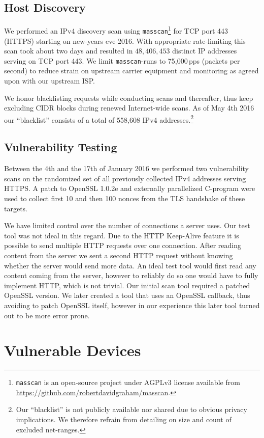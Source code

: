 \subsection{Host Discovery}
We performed an IPv4 discovery scan using \texttt{masscan}\footnote{\texttt{masscan} is an open-source project under AGPLv3 license available from \url{https://github.com/robertdavidgraham/masscan}.} for TCP port 443 (HTTPS) starting on new-years eve 2016. With appropriate rate-limiting this scan took about two days
and resulted in $48,406,453$ distinct IP addresses serving on TCP port 443. We limit \texttt{masscan}-runs to 75,000\,pps (packets per second) to reduce
strain on upstream carrier equipment and monitoring as agreed upon with our upstream ISP.

We honor blacklisting requests while conducting scans and thereafter, thus keep excluding CIDR blocks during renewed Internet-wide scans. As of May 4th 2016 our ``blacklist'' consists of a total of 558,608 IPv4 addresses.\footnote{Our ``blacklist'' is not publicly available nor shared due to obvious privacy implications. We therefore refrain from detailing on size and count of excluded net-ranges.}

\subsection{Vulnerability Testing}
Between the 4th and the 17th of January 2016 we performed two vulnerability scans on the randomized set of all previously collected IPv4 addresses serving HTTPS.
A patch to OpenSSL 1.0.2e and externally parallelized C-program were used to collect first 10 and then 100 nonces from the TLS handshake of these targets.

We have limited control over the number of connections a server uses. Our test tool was not ideal in this regard.
Due to the HTTP Keep-Alive feature
it is possible to send multiple HTTP requests over one connection. After reading content from the server we sent a second HTTP request without knowing whether the server would
send more data. An ideal test tool would first
read any content coming from the server, however to reliably do so one would have to fully implement
HTTP, which is not trivial.
Our initial scan tool required a patched OpenSSL version. We later created a tool that uses an OpenSSL
callback, thus avoiding to patch OpenSSL itself, however in our experience this later tool turned
out to be more error prone.

\section{Vulnerable Devices}

